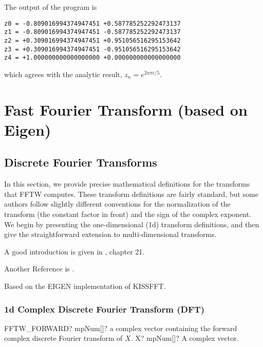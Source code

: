The output of the program is
\begin{verbatim}
z0 = -0.809016994374947451 +0.587785252292473137
z1 = -0.809016994374947451 -0.587785252292473137
z2 = +0.309016994374947451 +0.951056516295153642
z3 = +0.309016994374947451 -0.951056516295153642
z4 = +1.000000000000000000 +0.000000000000000000
\end{verbatim}

which agrees with the analytic result, $z_n = e^{2n\pi i/5}$. 





\chapter{Fast Fourier Transform (based on Eigen)}
\label{FastFourierTransform} 




\section{Discrete Fourier Transforms}

In this section, we provide precise mathematical definitions for the transforms that FFTW
computes. These transform definitions are fairly standard, but some authors follow slightly
different conventions for the normalization of the transform (the constant factor in front)
and the sign of the complex exponent. We begin by presenting the one-dimensional (1d)
transform definitions, and then give the straightforward extension to multi-dimensional
transforms.

A good introduction is given in \cite{Arndt_2011}, chapter 21.

Another Reference is \cite{Kammler_2008}.

Based on the EIGEN implementation of KISSFFT.


\subsection{1d Complex Discrete Fourier Transform (DFT)}


\begin{mpFunctionsExtract}
	\mpFunctionOne
	{FFTW\_FORWARD? mpNum[]? a complex vector containing the forward complex discrete Fourier transform of $X$.}
	{X? mpNum[]? A complex vector.}
\end{mpFunctionsExtract}



